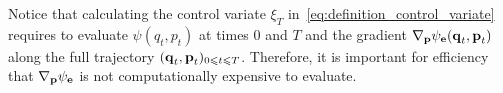 \documentclass[11pt,a4paper]{article}
\begin{document}

\begin{remark}
    \label{remark:cost_control_variate}
    Notice that calculating the control variate $\xi_T$ in~\eqref{eq:definition_control_variate} requires
    to evaluate $\psi(q_t, p_t)$ at times 0 and $T$ and the gradient $\nabla_{\boldsymbol{\mathbf p}} \psi_{\boldsymbol{\mathbf e}}(\boldsymbol{\mathbf q}_t, \boldsymbol{\mathbf p}_t)$ along the full trajectory $(\boldsymbol{\mathbf q}_t, \boldsymbol{\mathbf p}_t)_{0\leqslant t\leqslant T}$.
    Therefore, it is important for efficiency that $\nabla_{\boldsymbol{\mathbf p}} \psi_{\boldsymbol{\mathbf e}}$ is not computationally expensive to evaluate.
\end{remark}
\end{document}
